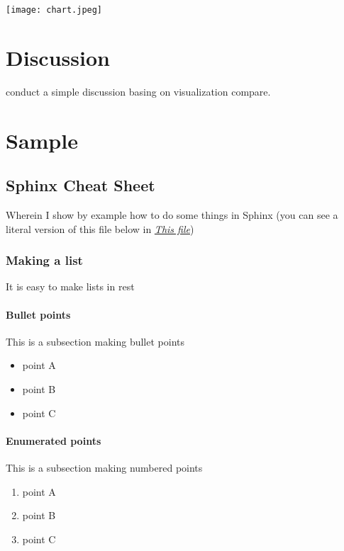 \documentclass[letterpaper,10pt,openany, oneside]{sphinxmanual}
\begin{document}
\texttt{[image: chart.jpeg]}


\chapter{Discussion}
\label{discussion:discussion}\label{discussion::doc}
conduct a simple discussion basing on visualization compare.


\chapter{Sample}
\label{sample:sample}\label{sample::doc}

\section{Sphinx Cheat Sheet}
\label{sample:sphinx-cheat-sheet}\label{sample:sphinx-helpers}
Wherein I show by example how to do some things in Sphinx (you can see
a literal version of this file below in {\hyperref[sample:sphinx-literal]{\emph{This file}}})


\subsection{Making a list}
\label{sample:id1}\label{sample:making-a-list}
It is easy to make lists in rest


\subsubsection{Bullet points}
\label{sample:bullet-points}
This is a subsection making bullet points
\begin{itemize}
\item {} 
point A

\item {} 
point B

\item {} 
point C

\end{itemize}


\subsubsection{Enumerated points}
\label{sample:enumerated-points}
This is a subsection making numbered points
\begin{enumerate}
\item {} 
point A

\item {} 
point B

\item {} 
point C

\end{enumerate}
\end{document}
